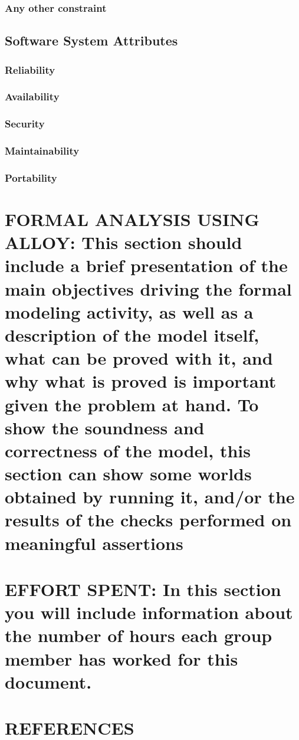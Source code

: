 \documentclass[12pt,a4paper]{article}
\begin{document}
\subsubsection{Any other constraint} 
\subsection{Software System Attributes} 
\subsubsection{Reliability}
\subsubsection{Availability}
\subsubsection{Security}
\subsubsection{Maintainability}
\subsubsection{Portability}
\section{FORMAL ANALYSIS USING ALLOY: This section should include a brief presentation of the 
main objectives driving the formal modeling activity, as well as a description of the model 
itself, what can be proved with it, and why what is proved is important given the problem at 
hand. To show  the soundness and correctness of the model,  this section can show some
worlds obtained by running it, and/or the results of the checks performed on meaningful 
assertions}
\section{EFFORT SPENT: In this section you will include information about the number of hours each 
group member has worked for this document.}
\section{REFERENCES}
\end{document}
